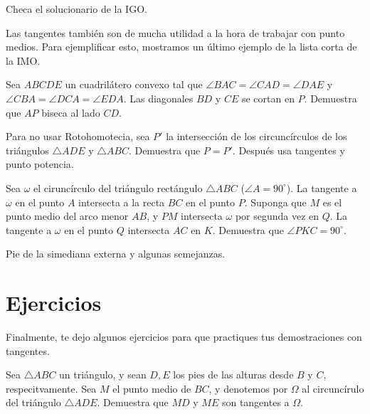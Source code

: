 \documentclass{article}
\begin{document}
\begin{solucion}
    Checa el solucionario de la IGO.
\end{solucion}

Las tangentes también son de mucha utilidad a la hora de trabajar con 
punto medios. Para ejemplificar esto, mostramos un último ejemplo de la 
lista corta de la IMO.\\

\begin{ejemplo}
    Sea $ABCDE$ un cuadrilátero convexo tal que
    $\angle BAC = \angle CAD = \angle DAE$ y 
    $\angle CBA = \angle DCA = \angle EDA$. Las diagonales $BD$ y $CE$ 
    se cortan en $P$. Demuestra que $AP$ biseca al lado $CD$.
\end{ejemplo}

\begin{solucion}
    Para no usar Rotohomotecia, sea $P'$ la intersección de los circuncírculos
    de los triángulos $\triangle ADE$ y $\triangle ABC$. Demuestra que 
    $P = P'$. Después usa tangentes y punto potencia.
\end{solucion}

\begin{ejemplo}
    Sea $\omega$ el ciruncírculo del triángulo rectángulo $\triangle ABC$
    ($\angle A = 90^{\circ}$). La tangente a $\omega$ en el punto $A$ intersecta
    a la recta $BC$ en el punto $P$. Suponga que $M$ es el punto medio del 
    arco menor $AB$, y $PM$ intersecta $\omega$ por segunda vez en $Q$. La 
    tangente a $\omega$ en el punto $Q$ intersecta $AC$ en $K$. Demuestra que 
    $\angle PKC = 90^{\circ}$.
\end{ejemplo}

\begin{solucion}
    Pie de la simediana externa y algunas semejanzas.
\end{solucion}

\section*{Ejercicios}

Finalmente, te dejo algunos ejercicios para que practiques tus demostraciones
con tangentes.

\begin{ejercicio}
    Sea $\triangle ABC$ un triángulo, y sean $D, E$ los pies de las 
    alturas desde $B$ y $C$, respecitvamente. Sea $M$ el punto medio de
    $BC$, y denotemos por $\Omega$ al circuncírulo del triángulo 
    $\triangle ADE$. Demuestra que $MD$ y $ME$ son tangentes a $\Omega$.
\end{ejercicio}
\end{document}
